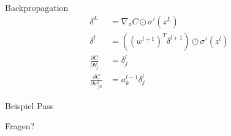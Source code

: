 \documentclass[aspectratio=169, 10pt]{beamer}
\begin{document}
\begin{frame}{Backpropagation}
  \begin{align*}
    \delta^L &= \nabla_aC \odot \sigma' \left(z^L\right)\\[1em]
    \delta^l &= \left(\left(w^{l+1}\right)^T \delta^{l+1}\right) \odot
               \sigma'\left(z^l\right)\\[1em]
    \frac{\partial C}{\partial b^l_j} &= \delta^l_j\\[1em]
    \frac{\partial C}{\partial w^l_{jk}} &= a^{l-1}_k\delta^l_j
  \end{align*}
\end{frame}

\begin{frame}{Beispiel}
  Pass
\end{frame}

\begin{frame}[standout]
  Fragen?
\end{frame}

\printbibliography[title=Literaturverzeichnis]
\end{document}
